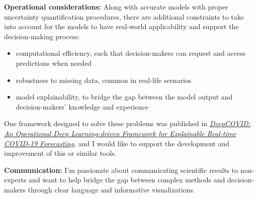 \documentclass[11pt, a4paper]{awesome-cv}
\begin{document}
\begin{cvletter}
\textbf{Operational considerations:} Along with accurate models with proper uncertainty quantification procedures, there are additional constraints to take into account for the models to have real-world applicability and support the decision-making process:
\begin{itemize}
  \item computational efficiency, such that decision-makers can request and access predictions when needed
  \item robustness to missing data, common in real-life scenarios
  \item model explainability, to bridge the gap between the model output and decision-makers' knowledge and experience
\end{itemize}
One framework designed to solve these problems was published in \href{https://ojs.aaai.org/index.php/AAAI/article/view/17808}{\textit{DeepCOVID: An Operational Deep Learning-driven Framework for Explainable Real-time COVID-19 Forecasting}}, and I would like to support the development and improvement of this or similar tools.
  
\textbf{Communication:} I'm passionate about communicating scientific results to non-experts and want to help bridge the gap between complex methods and decision-makers through clear language and informative visualizations.

\end{cvletter}

\makeletterclosing
\end{document}
